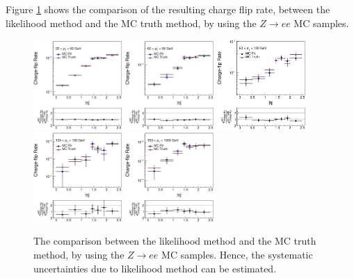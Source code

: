 Figure \ref{fig:charge_flip_sys_truth} shows the comparison of the resulting charge flip rate, between the likelihood method and the MC truth method, by using the $Z \rightarrow ee$ MC samples.
\begin{figure}
\centering
\includegraphics[width=0.3\textwidth]{data/plot/charge_flip/FitPlots/mc_cf_rate_0.eps}
\includegraphics[width=0.3\textwidth]{data/plot/charge_flip/FitPlots/mc_cf_rate_1.eps}
\includegraphics[width=0.3\textwidth]{data/plot/charge_flip/FitPlots/mc_cf_rate_2.eps} \\
\includegraphics[width=0.3\textwidth]{data/plot/charge_flip/FitPlots/mc_cf_rate_3.eps}
\includegraphics[width=0.3\textwidth]{data/plot/charge_flip/FitPlots/mc_cf_rate_4.eps}
\caption{The comparison between the likelihood method and the MC truth method, by using the $Z \rightarrow ee$ MC samples. Hence, the systematic uncertainties due to likelihood method can be estimated.}
\label{fig:charge_flip_sys_truth}
\end{figure}

